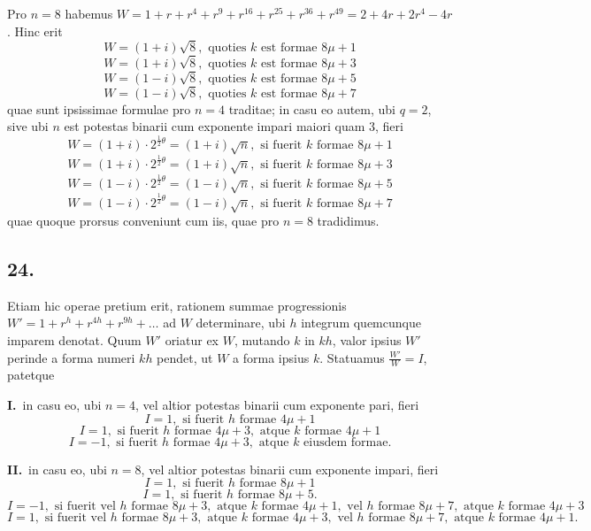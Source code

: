 \documentclass[12pt,a4paper]{article}
\theoremstyle{plain}
\begin{document}
Pro $n = 8$ habemus $W = 1 + r + r^4 + r^9 + r^{16} + r^{25} + r^{36} + r^{49} = 2 + 4r + 2r^4 - 4r$. Hinc erit
\[
W = (1+i)\sqrt{8}, \text{ quoties } k \text{ est formae } 8\mu+1
\]
\[
W = (1+i)\sqrt{8}, \text{ quoties } k \text{ est formae } 8\mu+3
\]
\[
W = (1-i)\sqrt{8}, \text{ quoties } k \text{ est formae } 8\mu+5
\]
\[
W = (1-i)\sqrt{8}, \text{ quoties } k \text{ est formae } 8\mu+7
\]
quae sunt ipsissimae formulae pro $n = 4$ traditae; in casu eo autem, ubi $q = 2$, sive ubi $n$ est potestas binarii cum exponente impari maiori quam $3$, fieri
\[
W = (1+i) \cdot 2^{\frac{1}{2}\theta} = (1+i)\sqrt{n}, \text{ si fuerit } k \text{ formae } 8\mu+1
\]
\[
W = (1+i) \cdot 2^{\frac{1}{2}\theta} = (1+i)\sqrt{n}, \text{ si fuerit } k \text{ formae } 8\mu+3
\]
\[
W = (1-i) \cdot 2^{\frac{1}{2}\theta} = (1-i)\sqrt{n}, \text{ si fuerit } k \text{ formae } 8\mu+5
\]
\[
W = (1-i) \cdot 2^{\frac{1}{2}\theta} = (1-i)\sqrt{n}, \text{ si fuerit } k \text{ formae } 8\mu+7
\]
quae quoque prorsus conveniunt cum iis, quae pro $n = 8$ tradidimus.

\subsection*{24.}

Etiam hic operae pretium erit, rationem summae progressionis $W' = 1 + r^{h} + r^{4h} + r^{9h} + \ldots$ ad $W$ determinare, ubi $h$ integrum quemcunque imparem denotat. Quum $W'$ oriatur ex $W$, mutando $k$ in $kh$, valor ipsius $W'$ perinde a forma numeri $kh$ pendet, ut $W$ a forma ipsius $k$. Statuamus $\frac{W'}{W} = I$, patetque

\medskip
\noindent\textbf{I.}\ in casu eo, ubi $n = 4$, vel altior potestas binarii cum exponente pari, fieri
\[
I = 1, \text{ si fuerit } h \text{ formae } 4\mu+1
\]
\[
I = 1, \text{ si fuerit } h \text{ formae } 4\mu+3, \text{ atque } k \text{ formae } 4\mu+1
\]
\[
I = -1, \text{ si fuerit } h \text{ formae } 4\mu+3, \text{ atque } k \text{ eiusdem formae.}
\]

\medskip
\noindent\textbf{II.}\ in casu eo, ubi $n = 8$, vel altior potestas binarii cum exponente impari, fieri
\[
I = 1, \text{ si fuerit } h \text{ formae } 8\mu+1
\]
\[
I = 1, \text{ si fuerit } h \text{ formae } 8\mu+5.
\]
\[
I = -1, \text{ si fuerit vel } h \text{ formae } 8\mu+3, \text{ atque } k \text{ formae } 4\mu+1, \text{ vel } h \text{ formae } 8\mu+7, \text{ atque } k \text{ formae } 4\mu+3
\]
\[
I = 1, \text{ si fuerit vel } h \text{ formae } 8\mu+3, \text{ atque } k \text{ formae } 4\mu+3, \text{ vel } h \text{ formae } 8\mu+7, \text{ atque } k \text{ formae } 4\mu+1.
\]
\end{document}
